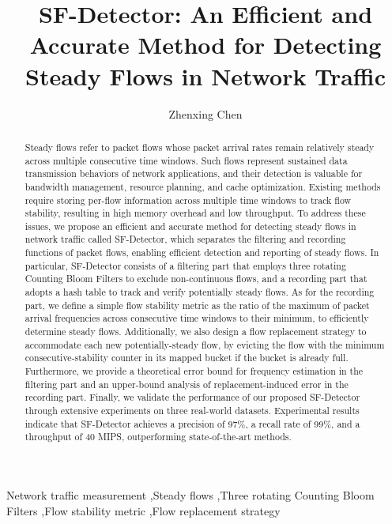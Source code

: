 \documentclass[preprint,12pt]{elsarticle}
\begin{document}
\begin{frontmatter}

\title{SF-Detector: An Efficient and Accurate Method for Detecting Steady Flows in Network Traffic}

\author[csust]{Zhenxing Chen}


\begin{abstract}
Steady flows refer to packet flows whose packet arrival rates remain relatively steady across multiple consecutive time windows. Such flows represent sustained data transmission behaviors of network applications, and their detection is valuable for bandwidth management, resource planning, and cache optimization. Existing methods require storing per-flow information across multiple time windows to track flow stability, resulting in high memory overhead and low throughput. To address these issues, we propose an efficient and accurate method for detecting steady flows in network traffic called SF-Detector, which separates the filtering and recording functions of packet flows, enabling efficient detection and reporting of steady flows. In particular, SF-Detector consists of a filtering part that employs three rotating Counting Bloom Filters to exclude non-continuous flows, and a recording part that adopts a hash table to track and verify potentially steady flows. As for the recording part, we define a simple flow stability metric as the ratio of the maximum of packet arrival frequencies across consecutive time windows to their minimum, to efficiently determine steady flows. Additionally, we also design a flow replacement strategy to accommodate each new potentially-steady flow, by evicting the flow with the minimum consecutive-stability counter in its mapped bucket if the bucket is already full. Furthermore, we provide a theoretical error bound for frequency estimation in the filtering part and an upper-bound analysis of replacement-induced error in the recording part. Finally, we validate the performance of our proposed SF-Detector through extensive experiments on three real-world datasets. Experimental results indicate that SF-Detector achieves a precision of 97\%, a recall rate of 99\%, and a throughput of 40 MIPS, outperforming state-of-the-art methods.
\end{abstract}

\begin{keyword}
Network traffic measurement \sep Steady flows \sep Three rotating Counting Bloom Filters \sep Flow stability metric \sep Flow replacement strategy
\end{keyword}

\end{frontmatter}
\end{document}
